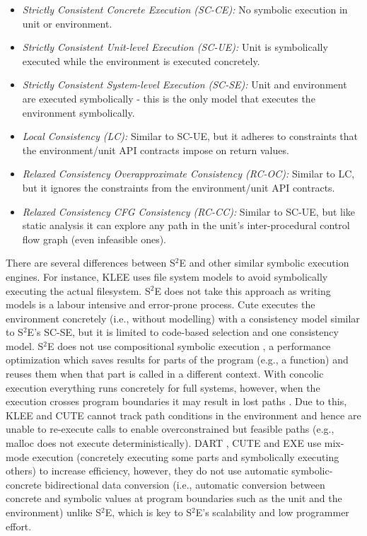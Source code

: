 \documentclass[conference]{IEEEtran}
\begin{document}
\begin{itemize}
\item \textit{Strictly Consistent Concrete Execution (SC-CE):}
No symbolic execution in unit or environment.
\item \textit{Strictly Consistent Unit-level Execution (SC-UE):}
Unit is symbolically executed while the
environment is executed concretely.
\item \textit{Strictly Consistent System-level Execution
(SC-SE):} Unit and environment are executed
symbolically - this is the only model that
executes the environment symbolically.
\item \textit{Local Consistency (LC):} Similar to SC-UE,
but it adheres to constraints that the
environment/unit API contracts impose on
return values.
\item \textit{Relaxed Consistency Overapproximate
Consistency (RC-OC):} Similar to LC, but it
ignores the constraints from the environment/unit API contracts.
\item \textit{Relaxed Consistency CFG Consistency (RC-CC):}
Similar to SC-UE, but like static analysis it can explore any
path in the unit's inter-procedural control flow graph (even
infeasible ones).
\end{itemize}

There are several differences between S$^2$E and other similar symbolic execution engines. For instance, KLEE uses file system models \cite{klee} to avoid symbolically executing the actual filesystem. S$^2$E does not take this approach as writing models is a labour intensive and error-prone process. Cute \cite{cute} executes the environment concretely (i.e., without modelling) with a consistency model similar to S$^2$E's SC-SE, but it is limited to code-based selection and one consistency model. S$^2$E does not use compositional symbolic execution \cite{compositional-test}, a performance optimization which saves results for parts of the program (e.g., a function) and reuses them when that part is called in a different context. With concolic execution everything runs concretely for full systems, however, when the execution crosses program boundaries it may result in lost paths \cite{s2e}. Due to this, KLEE and CUTE cannot track path conditions in the environment and hence are unable to re-execute calls to enable overconstrained but feasible paths (e.g., malloc does not execute deterministically). DART \cite{dart}, CUTE \cite{cute} and EXE \cite{exe} use mix-mode execution (concretely executing some parts and symbolically executing others) to increase efficiency, however, they do not use automatic symbolic-concrete bidirectional data conversion (i.e., automatic conversion between concrete and symbolic values at program boundaries such as the unit and the environment) unlike S$^2$E, which is key to S$^2$E's scalability and low programmer effort.
\end{document}

